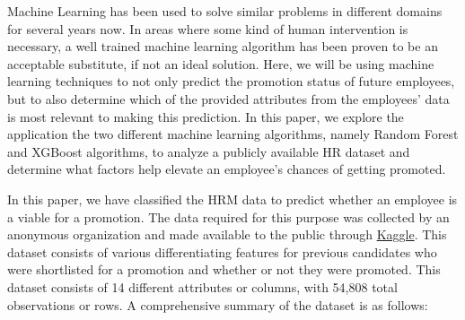 \documentclass[runningheads]{llncs}
\begin{document}
Machine Learning has been used to solve similar problems in different
domains for several years now. In areas where some kind of human
intervention is necessary, a well trained machine learning algorithm has
been proven to be an acceptable substitute, if not an ideal solution.
Here, we will be using machine learning techniques to not only predict
the promotion status of future employees, but to also determine which of
the provided attributes from the employees' data is most relevant to
making this prediction. In this paper, we explore the application the
two different machine learning algorithms, namely Random
Forest\cite{ref_Breiman2001} and
XGBoost\cite{ref_ChenG16} algorithms, to analyze a
publicly available HR dataset and determine what factors help elevate an
employee's chances of getting promoted.

In this paper, we have classified the HRM data to predict whether an
employee is a viable for a promotion. The data required for this purpose
was collected by an anonymous organization and made available to the
public through \href{https://www.kaggle.com}{Kaggle}. This dataset
consists of various differentiating features for previous candidates who
were shortlisted for a promotion and whether or not they were promoted.
This dataset consists of 14 different attributes or columns, with 54,808
total observations or rows. A comprehensive summary of the dataset is as
follows:
\end{document}
